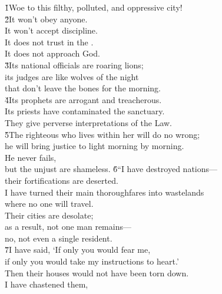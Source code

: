 \begin{poetry}
\poeml {}
\v{1}Woe to this filthy, polluted, and oppressive city! \\
\poeml \v{2}It won't obey anyone. \\
\poeml It won't accept discipline. \\
\poemll    It does not trust in the . \\
\poemlll       It does not approach God. \\
\poeml \v{3}Its national officials are roaring lions; \\
\poemll    its judges are like wolves of the night \\
\poemlll       that don't leave the bones for the morning. \\
\poeml \v{4}Its prophets are arrogant and treacherous. \\
\poemll    Its priests have contaminated the sanctuary. \\
\poemlll       They give perverse interpretations of the Law. \\
\poeml \v{5}The righteous  who lives within her will do no wrong; \\
\poemll    he will bring justice to light morning by morning. \\
\poeml He never fails, \\
\poemll    but the unjust are shameless.
\poeml \v{6}``I have destroyed nations--- \\
\poemll    their fortifications are deserted. \\
\poeml I have turned their main thoroughfares into wastelands \\
\poemll    where no one will travel. \\
\poeml Their cities are desolate; \\
\poemll    as a result, not one man remains--- \\
\poemlll       no, not even a single resident. \\
\poeml \v{7}I have said, `If only you would fear me, \\
\poemll    if only you would take my instructions to heart.' \\
\poemlll       Then their houses would not have been torn down. \\
\poeml I have chastened them, \\

\end{poetry}
